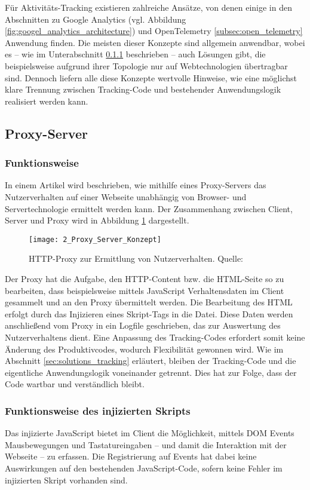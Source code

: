 Für Aktivitäts-Tracking existieren zahlreiche Ansätze, von denen einige in den Abschnitten zu Google Analytics (vgl. Abbildung \ref{fig:googel_analytics_architecture}) und OpenTelemetry \ref{subsec:open_telemetry} Anwendung finden. Die meisten dieser Konzepte sind allgemein anwendbar, wobei es – wie im Unterabschnitt \ref{subsec:proxy_server} beschrieben – auch Lösungen gibt, die beispielsweise aufgrund ihrer Topologie nur auf Webtechnologien übertragbar sind. Dennoch liefern alle diese Konzepte wertvolle Hinweise, wie eine möglichst klare Trennung zwischen Tracking-Code und bestehender Anwendungslogik realisiert werden kann.

\subsection{Proxy-Server}

\subsubsection{Funktionsweise}
\label{subsec:proxy_server}
In einem Artikel \cite{atterer2006knowing} wird beschrieben, wie mithilfe eines Proxy-Servers das Nutzerverhalten auf einer Webseite unabhängig von Browser- und Servertechnologie ermittelt werden kann. Der Zusammenhang zwischen Client, Server und Proxy wird in Abbildung \ref{fig:proxy_server_concept} dargestellt.

\begin{figure}[H]
\centering
\texttt{[image: 2\_Proxy\_Server\_Konzept]}
\caption{HTTP-Proxy zur Ermittlung von Nutzerverhalten. Quelle: \cite{atterer2006knowing}}
\label{fig:proxy_server_concept}
\end{figure}

Der Proxy hat die Aufgabe, den HTTP-Content bzw. die HTML-Seite so zu bearbeiten, dass beispielsweise mittels JavaScript Verhaltensdaten im Client gesammelt und an den Proxy übermittelt werden. Die Bearbeitung des HTML erfolgt durch das Injizieren eines Skript-Tags in die Datei. Diese Daten werden anschließend vom Proxy in ein Logfile geschrieben, das zur Auswertung des Nutzerverhaltens dient. Eine Anpassung des Tracking-Codes erfordert somit keine Änderung des Produktivcodes, wodurch Flexibilität gewonnen wird. Wie im Abschnitt \ref{sec:solutions_tracking} erläutert, bleiben der Tracking-Code und die eigentliche Anwendungslogik voneinander getrennt. Dies hat zur Folge, dass der Code wartbar und verständlich bleibt.

\subsubsection{Funktionsweise des injizierten Skripts}
Das injizierte JavaScript bietet im Client die Möglichkeit, mittels DOM Events \cite{mdn2025_domevents} Mausbewegungen und Tastatureingaben – und damit die Interaktion mit der Webseite – zu erfassen. Die Registrierung auf Events hat dabei keine Auswirkungen auf den bestehenden JavaScript-Code, sofern keine Fehler im injizierten Skript vorhanden sind.

